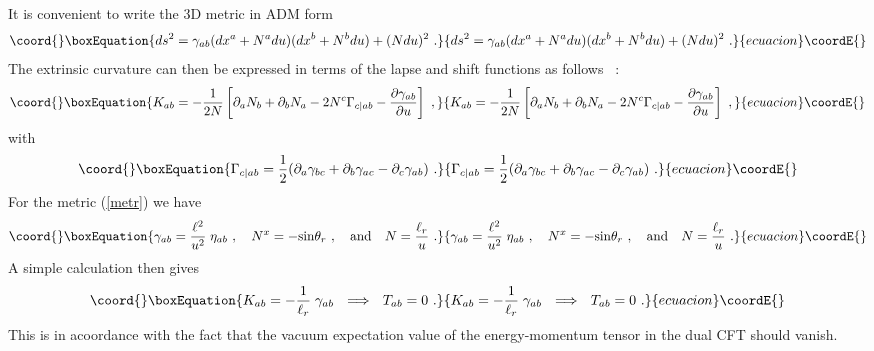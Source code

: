 \documentclass[a4paper,12pt,oneside]{article}
\begin{document}
 It is convenient to write  the 3D metric in  ADM
form
\begin{equation}\coord{}\boxEquation{
ds^2 = \gamma_{ab}(dx^a + N^a du)(dx^b +N^b du) + (N du)^2\ .
}{
ds^2 = \gamma_{ab}(dx^a + N^a du)(dx^b +N^b du) + (N du)^2\ .
}{ecuacion}\coordE{}\end{equation}
The extrinsic curvature can then be expressed in terms of the
lapse and shift functions as follows \cite{MTW}~:
\begin{equation}\coord{}\boxEquation{
K_{ab} = - {1\over 2N} \left[ \partial_{a} N_{b}
+ \partial_{b} N_{a} - 2 N^c \Gamma_{c\vert ab}
- {\partial\gamma_{ab}\over \partial u}  \right] \ ,
\label{Kadm}
}{
K_{ab} = - {1\over 2N} \left[ \partial_{a} N_{b}
+ \partial_{b} N_{a} - 2 N^c \Gamma_{c\vert ab}
- {\partial\gamma_{ab}\over \partial u}  \right] \ ,
}{ecuacion}\coordE{}\end{equation}
with
\begin{equation}\coord{}\boxEquation{
\Gamma_{c\vert ab} = {1\over 2} ( \partial_a\gamma_{bc} +
\partial_b\gamma_{ac} - \partial_c\gamma_{ab})\ .
}{
\Gamma_{c\vert ab} = {1\over 2} ( \partial_a\gamma_{bc} +
\partial_b\gamma_{ac} - \partial_c\gamma_{ab})\ .
}{ecuacion}\coordE{}\end{equation}
For the metric (\ref{metr}) we have
\begin{equation}\coord{}\boxEquation{
\gamma_{ab} = {\ell^2 \over u^2}\;  \eta_{ab}\ , \ \ \
N^x = - {\rm sin}\theta_{r}\ , \ \ \ {\rm and}\ \ \
N = {\ell_{r} \over u}\ .
}{
\gamma_{ab} = {\ell^2 \over u^2}\;  \eta_{ab}\ , \ \ \
N^x = - {\rm sin}\theta_{r}\ , \ \ \ {\rm and}\ \ \
N = {\ell_{r} \over u}\ .
}{ecuacion}\coordE{}\end{equation}
A simple calculation then gives
\begin{equation}\coord{}\boxEquation{
K_{ab} = -{1\over \ell_{r}}\; \gamma_{ab}\ \ \Longrightarrow \ \
T_{ab} = 0\ .
}{
K_{ab} = -{1\over \ell_{r}}\; \gamma_{ab}\ \ \Longrightarrow \ \
T_{ab} = 0\ .
}{ecuacion}\coordE{}\end{equation}
This is in acoordance with the fact that the vacuum expectation
value of the energy-momentum tensor in the dual CFT should vanish.
\end{document}
